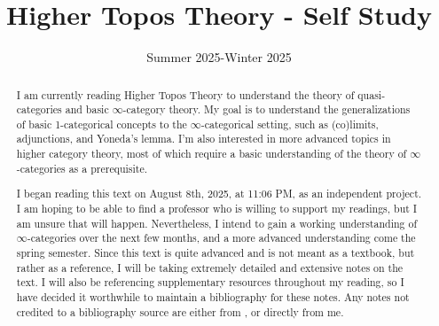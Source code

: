 \documentclass[A4, 11pt]{report}
\title{Higher Topos Theory - Self Study}
\date{Summer 2025-Winter 2025}
\begin{document}
\maketitle
\tableofcontents

\begin{abstract}
	I am currently reading Higher Topos Theory to understand the theory of quasi-categories and basic $\infty $-category theory. My goal is to understand the generalizations of basic 1-categorical concepts to the $\infty $-categorical setting, such as (co)limits, adjunctions, and Yoneda's lemma. I'm also interested in more advanced topics in higher category theory, most of which require a basic understanding of the theory of $\infty $-categories as a prerequisite.

	I began reading this text on August 8th, 2025, at 11:06 PM, as an independent project. I am hoping to be able to find a professor who is willing to support my readings, but I am unsure that will happen. Nevertheless, I intend to gain a working understanding of $\infty $-categories over the next few months, and a more advanced understanding come the spring semester. Since this text is quite advanced and is not meant as a textbook, but rather as a reference, I will be taking extremely detailed and extensive notes on the text. I will also be referencing supplementary resources throughout my reading, so I have decided it worthwhile to maintain a bibliography for these notes. Any notes not credited to a bibliography source are either from \cite{htt}, or directly from me.
\end{abstract}








\end{document}
